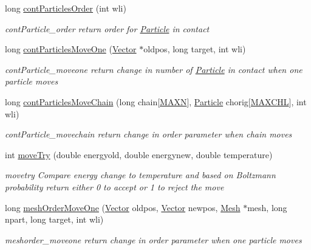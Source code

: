 \begin{DoxyCompactItemize}
long \hyperlink{class_move_creator_aacd74e8d3bd9b69a4acdaab74cf12bac}{cont\+Particles\+Order} (int wli)
\begin{DoxyCompactList}\small\item\em cont\+Particle\+\_\+order return order for \hyperlink{class_particle}{Particle} in contact \end{DoxyCompactList}\item 
long \hyperlink{class_move_creator_a35fe54b32e55b9168f1a960f2323fabe}{cont\+Particles\+Move\+One} (\hyperlink{class_vector}{Vector} $\ast$oldpos, long target, int wli)
\begin{DoxyCompactList}\small\item\em cont\+Particle\+\_\+moveone return change in number of \hyperlink{class_particle}{Particle} in contact when one particle moves \end{DoxyCompactList}\item 
long \hyperlink{class_move_creator_ab5be394f39e213e1cdf76905572b9733}{cont\+Particles\+Move\+Chain} (long chain\mbox{[}\hyperlink{macros_8h_ad1f79d9d99776d7353c6659c307c83c6}{M\+A\+X\+N}\mbox{]}, \hyperlink{class_particle}{Particle} chorig\mbox{[}\hyperlink{macros_8h_a6ba68031db49c489a6a5902f87b915c8}{M\+A\+X\+C\+H\+L}\mbox{]}, int wli)
\begin{DoxyCompactList}\small\item\em cont\+Particle\+\_\+movechain return change in order parameter when chain moves \end{DoxyCompactList}\item 
int \hyperlink{class_move_creator_a9040ec4da28b5826cfc2c989007af9ef}{move\+Try} (double energyold, double energynew, double temperature)
\begin{DoxyCompactList}\small\item\em movetry Compare energy change to temperature and based on Boltzmann probability return either 0 to accept or 1 to reject the move \end{DoxyCompactList}\item 
long \hyperlink{class_move_creator_a396df3236bc2f8a95fa4c6d6ef2e19b7}{mesh\+Order\+Move\+One} (\hyperlink{class_vector}{Vector} oldpos, \hyperlink{class_vector}{Vector} newpos, \hyperlink{class_mesh}{Mesh} $\ast$mesh, long npart, long target, int wli)
\begin{DoxyCompactList}\small\item\em meshorder\+\_\+moveone return change in order parameter when one particle moves \end{DoxyCompactList}\item 

\end{DoxyCompactItemize}
